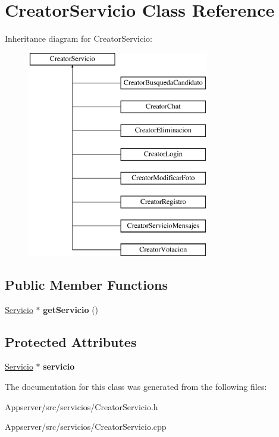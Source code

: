 \hypertarget{classCreatorServicio}{}\section{Creator\+Servicio Class Reference}
\label{classCreatorServicio}
Inheritance diagram for Creator\+Servicio\+:\begin{figure}[H]
\begin{center}
\leavevmode
\includegraphics[height=9.000000cm]{classCreatorServicio}
\end{center}
\end{figure}
\subsection*{Public Member Functions}
\begin{DoxyCompactItemize}
\item 
\hyperlink{classServicio}{Servicio} $\ast$ {\bfseries get\+Servicio} ()\hypertarget{classCreatorServicio_a042626a63aeae5c93e5bba72bcf8300c}{}\label{classCreatorServicio_a042626a63aeae5c93e5bba72bcf8300c}

\end{DoxyCompactItemize}
\subsection*{Protected Attributes}
\begin{DoxyCompactItemize}
\item 
\hyperlink{classServicio}{Servicio} $\ast$ {\bfseries servicio}\hypertarget{classCreatorServicio_a1b40845a249b255264aabf6e347cdb05}{}\label{classCreatorServicio_a1b40845a249b255264aabf6e347cdb05}

\end{DoxyCompactItemize}


The documentation for this class was generated from the following files\+:\begin{DoxyCompactItemize}
\item 
Appserver/src/servicios/Creator\+Servicio.\+h\item 
Appserver/src/servicios/Creator\+Servicio.\+cpp\end{DoxyCompactItemize}
